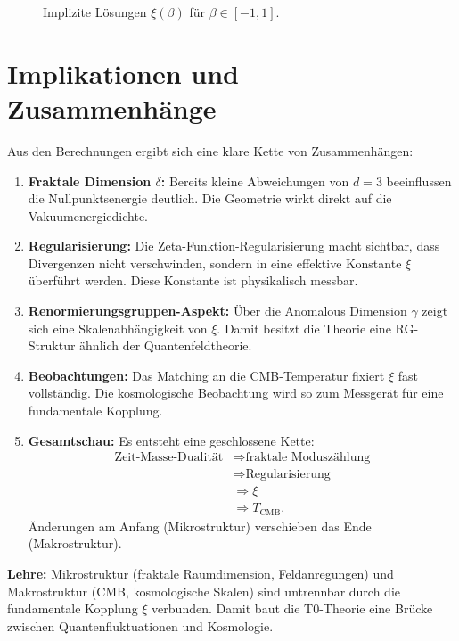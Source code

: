 	\begin{figure}[htbp]
		\centering

		\caption{Implizite Lösungen $\xi(\beta)$ für $\beta\in[-1,1]$.}
		\label{fig:xi_vs_beta}
	\end{figure}
	
	\section{Implikationen und Zusammenhänge}
	\label{sec:discussion}
	
	Aus den Berechnungen ergibt sich eine klare Kette von Zusammenhängen:
	
	\begin{enumerate}
		\item \textbf{Fraktale Dimension $\delta$:} Bereits kleine Abweichungen von $d=3$ beeinflussen die Nullpunktsenergie deutlich. Die Geometrie wirkt direkt auf die Vakuumenergiedichte.
		\item \textbf{Regularisierung:} Die Zeta-Funktion-Regularisierung macht sichtbar, dass Divergenzen nicht verschwinden, sondern in eine effektive Konstante $\xi$ überführt werden. Diese Konstante ist physikalisch messbar.
		\item \textbf{Renormierungsgruppen-Aspekt:} Über die Anomalous Dimension $\gamma$ zeigt sich eine Skalenabhängigkeit von $\xi$. Damit besitzt die Theorie eine RG-Struktur ähnlich der Quantenfeldtheorie.
		\item \textbf{Beobachtungen:} Das Matching an die CMB-Temperatur fixiert $\xi$ fast vollständig. Die kosmologische Beobachtung wird so zum Messgerät für eine fundamentale Kopplung.
		\item \textbf{Gesamtschau:} Es entsteht eine geschlossene Kette:
	\[
	\begin{aligned}
		\text{Zeit-Masse-Dualität} &\Rightarrow \text{fraktale Moduszählung} \\
		&\Rightarrow \text{Regularisierung} \\
		&\Rightarrow \xi \\
		&\Rightarrow T_{\mathrm{CMB}}.
	\end{aligned}
	\]
		Änderungen am Anfang (Mikrostruktur) verschieben das Ende (Makrostruktur).
	\end{enumerate}
	
	\textbf{Lehre:} Mikrostruktur (fraktale Raumdimension, Feldanregungen) und Makrostruktur (CMB, kosmologische Skalen) sind untrennbar durch die fundamentale Kopplung $\xi$ verbunden. Damit baut die T0-Theorie eine Brücke zwischen Quantenfluktuationen und Kosmologie.
	
